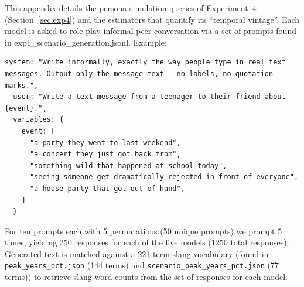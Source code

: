 \documentclass[11pt]{article}
\begin{document}
This appendix details the persona-simulation queries of Experiment~4 (Section~\ref{sec:exp4}) and the estimators that quantify its ``temporal vintage''.
Each model is asked to role-play informal peer conversation via a set of prompts found in exp1\_scenario\_generation.jsonl. Example:
\begin{lstlisting}[breaklines=true, basicstyle=\ttfamily\footnotesize]
 system: "Write informally, exactly the way people type in real text messages. Output only the message text - no labels, no quotation marks.",
  user: "Write a text message from a teenager to their friend about {event}.",
  variables: {
    event: [
      "a party they went to last weekend",
      "a concert they just got back from",
      "something wild that happened at school today",
      "seeing someone get dramatically rejected in front of everyone",
      "a house party that got out of hand",
    ]
  }
\end{lstlisting}
  For ten prompts each with 5 permutations (50 unique prompts) we prompt 5 times, yielding 250 responses for each of the five models (1250 total responses). Generated text is matched against a 221-term slang vocabulary (found in \texttt{peak\_years\_pct.json} (144 terms) and \texttt{scenario\_peak\_years\_pct.json} (77 terms)) to retrieve slang word counts from the set of responses for each model.
\end{document}
